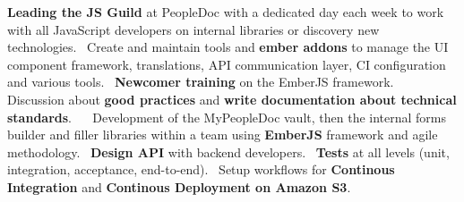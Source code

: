 \documentclass{moderncv}
\begin{document}
{	\textbf{Leading the JS Guild} at PeopleDoc with a dedicated day each week to work with all JavaScript developers on internal libraries or discovery new technologies.\newline~
	Create and maintain tools and \textbf{ember addons} to manage the UI component framework, translations, API communication layer, CI configuration and various tools.\newline~
	\textbf{Newcomer training} on the EmberJS framework.\newline~
	Discussion about \textbf{good practices} and \textbf{write documentation about technical standards}.\newline~
	\newline~
	Development of the MyPeopleDoc vault, then the internal forms builder and filler libraries within a team using \textbf{EmberJS} framework and agile methodology.\newline~
	\textbf{Design API} with backend developers.\newline~
	\textbf{Tests} at all levels (unit, integration, acceptance, end-to-end).\newline~
	Setup workflows for \textbf{Continous Integration} and \textbf{Continous Deployment on Amazon S3}.
}

\vspace{1.0em}


\vspace{1.0em}

\end{document}
